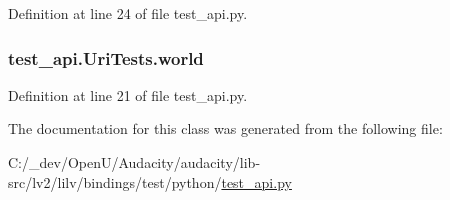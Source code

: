 Definition at line 24 of file test\+\_\+api.\+py.

\subsubsection[{\texorpdfstring{world}{world}}]{\setlength{\rightskip}{0pt plus 5cm}test\+\_\+api.\+Uri\+Tests.\+world}\hypertarget{classtest__api_1_1_uri_tests_a95469a5f55e1811c2ef07504c628d313}{}\label{classtest__api_1_1_uri_tests_a95469a5f55e1811c2ef07504c628d313}


Definition at line 21 of file test\+\_\+api.\+py.



The documentation for this class was generated from the following file\+:\begin{DoxyCompactItemize}
\item 
C\+:/\+\_\+dev/\+Open\+U/\+Audacity/audacity/lib-\/src/lv2/lilv/bindings/test/python/\hyperlink{test__api_8py}{test\+\_\+api.\+py}\end{DoxyCompactItemize}
